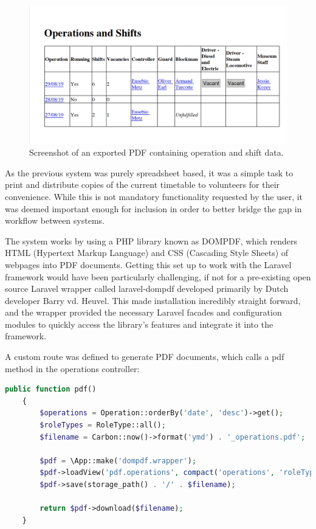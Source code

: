 \begin{figure}[!ht]
    \centering
    \includegraphics[width=1.0\textwidth]{Figures/screenshot-pdf}
    \caption{Screenshot of an exported PDF containing operation and shift data.}
    \label{fig:calendarview}
\end{figure}

As the previous system was purely spreadsheet based, it was a simple task to print and distribute copies of the current timetable to volunteers for their convenience. While this is not mandatory functionality requested by the user, it was deemed important enough for inclusion in order to better bridge the gap in workflow between systems. 

The system works by using a PHP library known as DOMPDF, which renders HTML (Hypertext Markup Language) and CSS (Cascading Style Sheets) of webpages into PDF documents. Getting this set up to work with the Laravel framework would have been particularly challenging, if not for a pre-existing open source Laravel wrapper called laravel-dompdf developed primarily by Dutch developer Barry vd. Heuvel. This made installation incredibly straight forward, and the wrapper provided the necessary Laravel facades and configuration modules to quickly access the library's features and integrate it into the framework. \cite{dompdf1} \cite{Heuvel1}

A custom route was defined to generate PDF documents, which calls a pdf method in the operations controller:

\begin{lstlisting}[language=PHP, breaklines]
    public function pdf()
    {
        $operations = Operation::orderBy('date', 'desc')->get();
        $roleTypes = RoleType::all();
        $filename = Carbon::now()->format('ymd') . '_operations.pdf';
    
        $pdf = \App::make('dompdf.wrapper');
        $pdf->loadView('pdf.operations', compact('operations', 'roleTypes'));
        $pdf->save(storage_path() . '/' . $filename);
    
        return $pdf->download($filename);
    }
\end{lstlisting}

